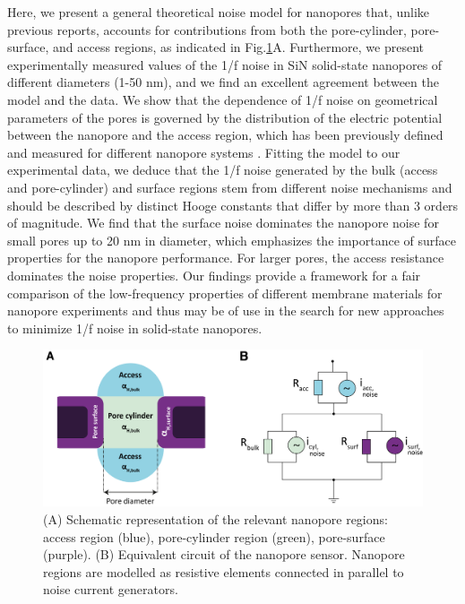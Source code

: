 Here, we present a general theoretical noise model for nanopores that, unlike previous reports, accounts for contributions from both the pore-cylinder, pore-surface, and access regions, as indicated in Fig.\ref{fig:sketch}A. Furthermore, we present experimentally measured values of the 1/f noise in SiN solid-state nanopores of different diameters (1-50 nm), and we find an excellent agreement between the model and the data. We show that the dependence of 1/f noise on geometrical parameters of the pores is governed by the distribution of the electric potential between the nanopore and the access region, which has been previously defined \cite{Hall1975} and measured for different nanopore systems \cite{Bezrukov1996,Kowalczyk2011b}. Fitting the model to our experimental data, we deduce that the 1/f noise generated by the bulk (access and pore-cylinder) and surface regions stem from different noise mechanisms and should be described by distinct Hooge constants that differ by more than 3 orders of magnitude. We find that the surface noise dominates the nanopore noise for small pores up to 20 nm in diameter, which emphasizes the importance of surface properties for the nanopore performance. For larger pores, the access resistance dominates the noise properties. Our findings provide a framework for a fair comparison of the low-frequency properties of different membrane materials for nanopore experiments and thus may be of use in the search for new approaches to minimize 1/f noise in solid-state nanopores. 


\begin{figure}
		\includegraphics[width=\linewidth]{figures/Figure2.1.png}
		\caption{(A) Schematic representation of the relevant nanopore regions: access region (blue), pore-cylinder region (green), pore-surface (purple). (B) Equivalent circuit of the nanopore sensor. Nanopore regions are modelled as resistive elements connected in parallel to noise current generators.}
		\label{fig:sketch}
\end{figure}

